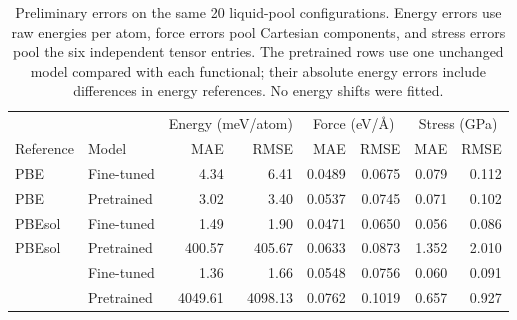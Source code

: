 \begin{table}[t]
\caption{Preliminary errors on the same 20 liquid-pool configurations. Energy errors use raw energies per atom, force errors pool Cartesian components, and stress errors pool the six independent tensor entries. The pretrained rows use one unchanged model compared with each functional; their absolute energy errors include differences in energy references. No energy shifts were fitted.}
\label{tab:fit}
\begin{ruledtabular}
\begin{tabular}{llrrrrrr}
 & & \multicolumn{2}{c}{Energy (meV/atom)} & \multicolumn{2}{c}{Force (eV/\AA)} & \multicolumn{2}{c}{Stress (GPa)} \\
Reference & Model & MAE & RMSE & MAE & RMSE & MAE & RMSE \\
\hline
PBE & Fine-tuned & 4.34 & 6.41 & 0.0489 & 0.0675 & 0.079 & 0.112 \\
PBE & Pretrained & 3.02 & 3.40 & 0.0537 & 0.0745 & 0.071 & 0.102 \\
PBEsol & Fine-tuned & 1.49 & 1.90 & 0.0471 & 0.0650 & 0.056 & 0.086 \\
PBEsol & Pretrained & 400.57 & 405.67 & 0.0633 & 0.0873 & 1.352 & 2.010 \\
\rscan{} & Fine-tuned & 1.36 & 1.66 & 0.0548 & 0.0756 & 0.060 & 0.091 \\
\rscan{} & Pretrained & 4049.61 & 4098.13 & 0.0762 & 0.1019 & 0.657 & 0.927 \\
\end{tabular}
\end{ruledtabular}
\end{table}

